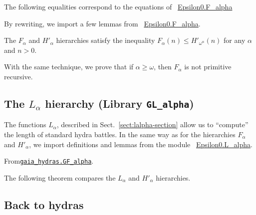 
The following equalities correspond to the equations of
~\href{../theories/html/hydras.Epsilon0.F_alpha.html}{Epsilon0.F\_alpha}



By rewriting, we import a few lemmas from
~\href{../theories/html/hydras.Epsilon0.F_alpha.html}{Epsilon0.F\_alpha}.




The $F_\alpha$ and $H'_\alpha$  hierarchies satisfy the inequality
$F_\alpha(n)\leq H'_{\omega^\alpha}(n)$ for any $\alpha$ and $n>0$.


With the same technique, we prove that if
$\alpha\geq\omega$, then $F_\alpha$ is not primitive recursive.


\subsection{The \texorpdfstring{$L_\alpha$}{\texttt{L\_alpha}} hierarchy (Library \texttt{GL\_alpha})}



The functions $L_\alpha$, described in Sect.~\vref{sect:lalpha-section}  allow us to ``compute'' the length of standard hydra battles. In the same way as for the hierarchies $F_\alpha$ and $H'_\alpha$, we import  definitions and lemmas from the module
~\href{../theories/html/hydras.Epsilon0.L_alpha.html}{Epsilon0.L\_alpha}.


\vspace{4pt}
\noindent
From\href{../theories/html/gaia_hydras.GF_alpha.html}%
{\texttt{gaia\_hydras.GF\_alpha}}.


The following theorem compares the $L_\alpha$ and $H'_\alpha$ hierarchies.


\subsection{Back to hydras}

